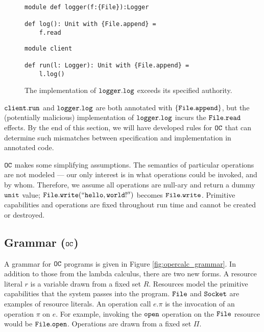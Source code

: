 \begin{figure}[h]
\vspace{-5pt}

\begin{lstlisting}
module def logger(f:{File}):Logger

def log(): Unit with {File.append} =
    f.read
\end{lstlisting}

\begin{lstlisting}
module client

def run(l: Logger): Unit with {File.append} =
    l.log()
\end{lstlisting}

\vspace{-7pt}
\caption{The implementation of $\mathtt{logger.log}$ exceeds its specified authority.}
\label{fig:opercalc_motivating}
\end{figure}

$\mathtt{client.run}$ and $\mathtt{logger.log}$ are both annotated with $\{ \mathtt{File.append} \}$, but the (potentially malicious) implementation of $\mathtt{logger.log}$ incurs the $\mathtt{File.read}$ effects.
By the end of this section, we will have developed rules for $\mathtt{OC}$ that can determine such mismatches between specification and implementation in annotated code.

$\mathtt{OC}$ makes some simplifying assumptions.
The semantics of particular operations are not modeled --- our only interest is in what operations could be invoked, and by whom.
Therefore, we assume all operations are null-ary and return a dummy $\mathtt{unit}$ value; $\mathtt{File.write(``hello, world!'')}$ becomes $\mathtt{File.write}$.
Primitive capabilities and operations are fixed throughout run time and cannot be created or destroyed.

\subsection{Grammar ($\mathtt{OC}$)}

A grammar for $\mathtt{OC}$ programs is given in Figure \ref{fig:opercalc_grammar}. In addition to those from the lambda calculus, there are two new forms. A resource literal $r$ is a variable drawn from a fixed set $R$. Resources model the primitive capabilities that the system passes into the program. $\mathtt{File}$ and $\mathtt{Socket}$ are examples of resource literals. An operation call $e.\pi$ is the invocation of an operation $\pi$ on $e$. For example, invoking the $\mathtt{open}$ operation on the $\mathtt{File}$ resource would be $\mathtt{File.open}$. Operations are drawn from a fixed set $\Pi$.

